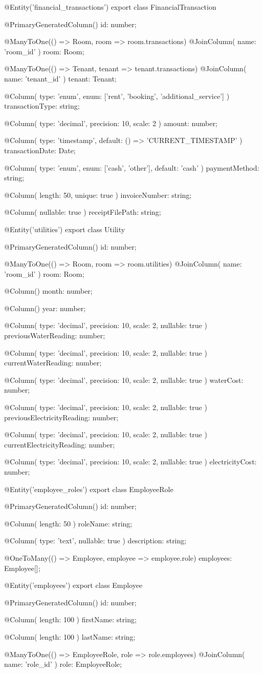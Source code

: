 @Entity('financial_transactions')
export class FinancialTransaction {
  @PrimaryGeneratedColumn()
  id: number;

  @ManyToOne(() => Room, room => room.transactions)
  @JoinColumn({ name: 'room_id' })
  room: Room;

  @ManyToOne(() => Tenant, tenant => tenant.transactions)
  @JoinColumn({ name: 'tenant_id' })
  tenant: Tenant;

  @Column({ 
    type: 'enum', 
    enum: ['rent', 'booking', 'additional_service'] 
  })
  transactionType: string;

  @Column({ type: 'decimal', precision: 10, scale: 2 })
  amount: number;

  @Column({ type: 'timestamp', default: () => 'CURRENT_TIMESTAMP' })
  transactionDate: Date;

  @Column({ 
    type: 'enum', 
    enum: ['cash', 'other'], 
    default: 'cash' 
  })
  paymentMethod: string;

  @Column({ length: 50, unique: true })
  invoiceNumber: string;

  @Column({ nullable: true })
  receiptFilePath: string;
}

@Entity('utilities')
export class Utility {
  @PrimaryGeneratedColumn()
  id: number;

  @ManyToOne(() => Room, room => room.utilities)
  @JoinColumn({ name: 'room_id' })
  room: Room;

  @Column()
  month: number;

  @Column()
  year: number;

  @Column({ type: 'decimal', precision: 10, scale: 2, nullable: true })
  previousWaterReading: number;

  @Column({ type: 'decimal', precision: 10, scale: 2, nullable: true })
  currentWaterReading: number;

  @Column({ type: 'decimal', precision: 10, scale: 2, nullable: true })
  waterCost: number;

  @Column({ type: 'decimal', precision: 10, scale: 2, nullable: true })
  previousElectricityReading: number;

  @Column({ type: 'decimal', precision: 10, scale: 2, nullable: true })
  currentElectricityReading: number;

  @Column({ type: 'decimal', precision: 10, scale: 2, nullable: true })
  electricityCost: number;
}

@Entity('employee_roles')
export class EmployeeRole {
  @PrimaryGeneratedColumn()
  id: number;

  @Column({ length: 50 })
  roleName: string;

  @Column({ type: 'text', nullable: true })
  description: string;

  @OneToMany(() => Employee, employee => employee.role)
  employees: Employee[];
}

@Entity('employees')
export class Employee {
  @PrimaryGeneratedColumn()
  id: number;

  @Column({ length: 100 })
  firstName: string;

  @Column({ length: 100 })
  lastName: string;

  @ManyToOne(() => EmployeeRole, role => role.employees)
  @JoinColumn({ name: 'role_id' })
  role: EmployeeRole;
}